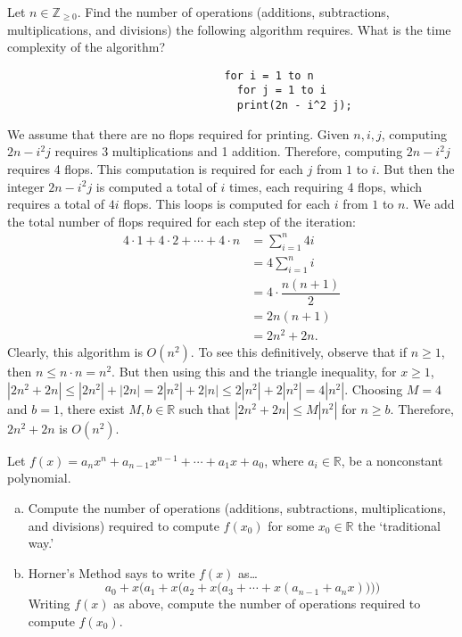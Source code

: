 \documentclass[11pt,letterpaper]{article}
\begin{document}
\newpage





 Let $n \in \mathbb{Z}_{\geq 0}$. Find the number of operations (additions, subtractions, multiplications, and divisions) the following algorithm requires. What is the time complexity of the algorithm?
	\begin{verbatim}
	                              for i = 1 to n
	                                for j = 1 to i
	                                print(2n - i^2 j); 
	\end{verbatim} \pspace

\sol We assume that there are no flops required for printing. Given $n, i, j$, computing $2n - i^2 j$ requires 3 multiplications and 1 addition. Therefore, computing $2n - i^2 j $ requires 4 flops. This computation is required for each $j$ from $1$ to $i$. But then the integer $2n - i^2 j$ is computed a total of $i$ times, each requiring 4 flops, which requires a total of $4i$ flops. This loops is computed for each $i$ from $1$ to $n$. We add the total number of flops required for each step of the iteration:
	\[
	\begin{aligned}
	4 \cdot 1 + 4 \cdot 2 + \cdots + 4 \cdot n&= \sum_{i= 1}^n 4i \\[0.3cm]
	&= 4 \sum_{i=1}^n i \\[0.3cm]
	&= 4 \cdot \dfrac{n (n + 1)}{2} \\[0.3cm]
	&= 2n(n+1) \\[0.3cm]
	&= 2n^2 + 2n.
	\end{aligned}
	\]
Clearly, this algorithm is $O(n^2)$. To see this definitively, observe that if $n \geq 1$, then $n \leq n \cdot n= n^2$. But then using this and the triangle inequality, for $x \geq 1$, $|2n^2 + 2n| \leq |2n^2| + |2n|= 2|n^2| + 2|n| \leq 2|n^2| + 2|n^2|= 4|n^2|$. Choosing $M= 4$ and $b= 1$, there exist $M, b \in \mathbb{R}$ such that $|2n^2 + 2n| \leq M |n^2|$ for $n \geq b$. Therefore, $2n^2 + 2n$ is $O(n^2)$. 





\newpage





 Let $f(x)= a_n x^n + a_{n-1} x^{n-1} + \cdots + a_1x + a_0$, where $a_i \in \mathbb{R}$, be a nonconstant polynomial. 
\begin{enumerate}[(a)]
\item Compute the number of operations (additions, subtractions, multiplications, and divisions) required to compute $f(x_0)$ for some $x_0 \in \mathbb{R}$ the `traditional way.' 
\item Horner's Method says to write $f(x)$ as\dots
	\[
	a_0 + x \bigg(a_1 + x \big( a_2 + x \big( a_3 + \cdots + x (a_{n-1} + a_n x ) \big) \big) \bigg) 
	\]
Writing $f(x)$ as above, compute the number of operations required to compute $f(x_0)$. 
\end{enumerate} \pspace
\end{document}
